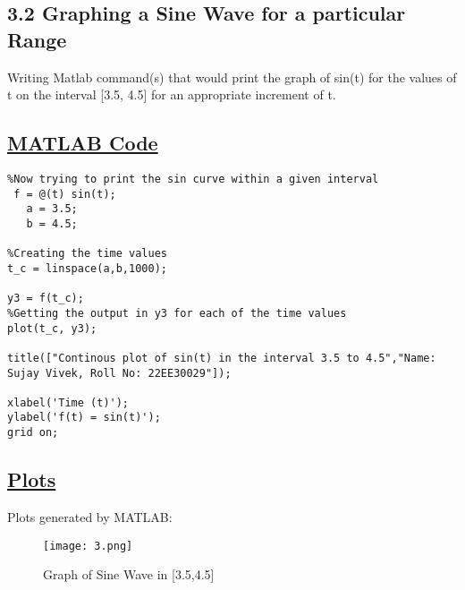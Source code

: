 \documentclass[a4paper,12pt,fleqn]{article}
\begin{document}
\newpage
\subsection*{3.2 Graphing a Sine Wave for a particular Range}
Writing Matlab command(s) that would print the graph of sin(t) for the values of t on the interval [3.5, 4.5] for an appropriate increment of t.



\subsection*{\underline{MATLAB Code}}
\begin{lstlisting}
%Now trying to print the sin curve within a given interval
 f = @(t) sin(t);
   a = 3.5;
   b = 4.5;

%Creating the time values
t_c = linspace(a,b,1000);

y3 = f(t_c); 
%Getting the output in y3 for each of the time values
plot(t_c, y3);

title(["Continous plot of sin(t) in the interval 3.5 to 4.5","Name: Sujay Vivek, Roll No: 22EE30029"]);

xlabel('Time (t)');
ylabel('f(t) = sin(t)');
grid on;

\end{lstlisting}
\subsection*{\underline{Plots}}
Plots generated by MATLAB:
\newline


    \begin{subfigure}{1.15\textwidth} %
        \centering
        \texttt{[image: 3.png]}
        \caption{Graph of Sine Wave in [3.5,4.5]}
    \end{subfigure}

\end{document}
